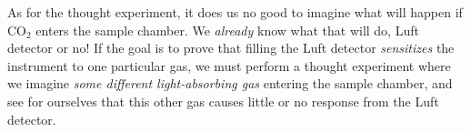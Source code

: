 \vskip 10pt

As for the thought experiment, it does us no good to imagine what will happen if CO$_{2}$ enters the sample chamber.  We {\it already} know what that will do, Luft detector or no!  If the goal is to prove that filling the Luft detector {\it sensitizes} the instrument to one particular gas, we must perform a thought experiment where we imagine {\it some different light-absorbing gas} entering the sample chamber, and see for ourselves that this other gas causes little or no response from the Luft detector.












